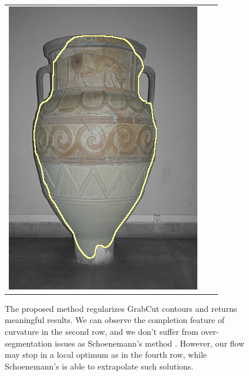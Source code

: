 \documentclass[smallextended]{svjour3}       %
\begin{document}
{{\begin{figure}[ht!]
\begin{tabular}{ccc}
		\includegraphics[scale=0.2]{images/segmentation/bc/vase/corrected-seg.png}		
	\end{tabular}
	\caption{The proposed method regularizes GrabCut \cite{rother04grabcut} contours and returns meaningful results. We can observe the completion feature of curvature in the second row, and we don't suffer from over-segmentation issues as Schoenemann's method \cite{schoenemann09linear}. However, our flow may stop in a local optimum as in the fourth row, while Schoenemann's is able to extrapolate such solutions.}
	\label{fig:segmentation-results}	
\end{figure}


}}
\end{document}
